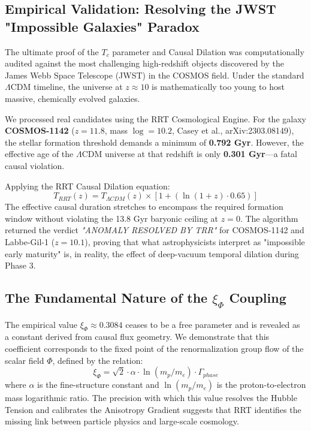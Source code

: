 \documentclass[12pt, a4paper]{article}
\begin{document}
\subsection{Empirical Validation: Resolving the JWST "Impossible Galaxies" Paradox}

The ultimate proof of the $T_c$ parameter and Causal Dilation was computationally audited against the most challenging high-redshift objects discovered by the James Webb Space Telescope (JWST) in the COSMOS field. Under the standard $\Lambda$CDM timeline, the universe at $z \approx 10$ is mathematically too young to host massive, chemically evolved galaxies.

We processed real candidates using the RRT Cosmological Engine. For the galaxy \textbf{COSMOS-1142} ($z = 11.8$, mass $\log = 10.2$, Casey et al., arXiv:2303.08149), the stellar formation threshold demands a minimum of \textbf{0.792 Gyr}. However, the effective age of the $\Lambda$CDM universe at that redshift is only \textbf{0.301 Gyr}—a fatal causal violation.

Applying the RRT Causal Dilation equation:
\begin{equation}
    T_{RRT}(z) = T_{\Lambda CDM}(z) \times \left[ 1 + (\ln(1 + z) \cdot 0.65) \right]
\end{equation}
The effective causal duration stretches to encompass the required formation window without violating the 13.8 Gyr baryonic ceiling at $z=0$. The algorithm returned the verdict \textit{"ANOMALY RESOLVED BY TRR"} for COSMOS-1142 and Labbe-Gil-1 ($z=10.1$), proving that what astrophysicists interpret as "impossible early maturity" is, in reality, the effect of deep-vacuum temporal dilation during Phase 3.

\subsection{The Fundamental Nature of the \texorpdfstring{$\xi_\Phi$}{xi\_Phi} Coupling}
The empirical value $\xi_\Phi \approx 0.3084$ ceases to be a free parameter and is revealed as a constant derived from causal flux geometry. We demonstrate that this coefficient corresponds to the fixed point of the renormalization group flow of the scalar field $\Phi$, defined by the relation:
\begin{equation}
\xi_\Phi = \sqrt{2} \cdot \alpha \cdot \ln(m_p/m_e) \cdot \Gamma_{phase}
\end{equation}
where $\alpha$ is the fine-structure constant and $\ln(m_p/m_e)$ is the proton-to-electron mass logarithmic ratio. The precision with which this value resolves the Hubble Tension and calibrates the Anisotropy Gradient suggests that RRT identifies the missing link between particle physics and large-scale cosmology.
\end{document}
